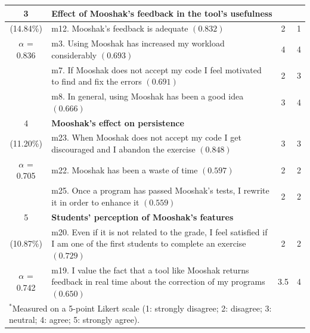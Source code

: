 \documentclass[twoside]{urjc-tfg}
\begin{document}
\begin{table}
\begin{scriptsize}
\begin{tabular}{clcc}
   \hline
    3 & \multicolumn{3}{l}{\textbf{Effect of Mooshak's feedback in the tool's usefulness} } \\
   \hline
    (14.84\%) & m12. Mooshak's feedback is adequate $(0.832)$ & 2 & 1\\
    $\alpha$ = 0.836 & m3. Using Mooshak has increased my workload considerably $(0.693)$ & 4 & 4 \\
     & m7.  If Mooshak does not accept my code I feel motivated to find and fix the errors $(0.691)$ & 2 & 3 \\
     & m8.  In general, using Mooshak has been a good idea $(0.666)$ & 3 & 4 \\
   \hline
    4 & \multicolumn{3}{l}{\textbf{Mooshak's effect on persistence} } \\
   \hline
    (11.20\%) & m23. When Mooshak does not accept my code I get discouraged and I abandon the exercise $(0.848)$ & 3 & 3 \\
    $\alpha$ = 0.705 & m22. Mooshak has been a waste of time $(0.597)$ & 2 & 2 \\
    & m25. Once a program has passed Mooshak's tests, I rewrite it in order to enhance it $(0.559)$ & 2 & 2 \\
   \hline
   5 & \multicolumn{3}{l}{\textbf{Students' perception of Mooshak's features} } \\
   \hline
    (10.87\%) & m20. Even if it is not related to the grade, I feel satisfied if I am one of the first students to complete an exercise $(0.729)$ & 2 & 2\\
   $\alpha$ = 0.742  & m19. I value the fact that a tool like Mooshak returns feedback in real time about the correction of my programs $(0.650)$ & 3.5 & 4 \\
   \hline
\multicolumn{4}{l}{\scriptsize $^{*}$Measured on a 5-point Likert scale (1: strongly disagree; 2: disagree; 3: neutral; 4: agree; 5: strongly agree).}
  \end{tabular}
\end{scriptsize}
\end{table}
\end{document}
